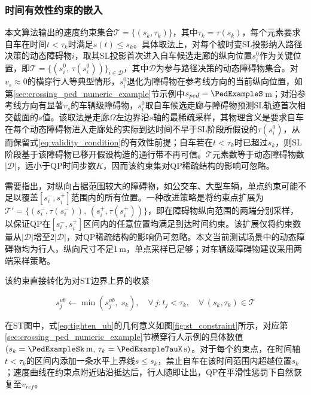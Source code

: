 \subsubsection{时间有效性约束的嵌入}
本文算法输出的速度约束集合$\mathcal{T} = \{(s_k, \tau_k)\}$，其中$\tau_k = \tau(s_k)$，每个元素要求自车在时间$t<\tau_k$时满足$s(t)\leq s_k$。具体取法上，对每个被时变SL投影纳入路径决策的动态障碍物$i$，取其SL投影首次进入自车候选走廊的纵向位置$s_i^{0}$作为关键位置，即$\mathcal{T} = \{(s_i^{0},\,\tau(s_i^{0}))\}_{i\in\mathcal{D}}$，其中$\mathcal{D}$为参与路径决策的动态障碍物集合。对$v_s\approx 0$的横穿行人等典型情形，$s_i^{0}$退化为障碍物在参考线方向的当前纵向位置，如第\ref{sec:crossing_ped_numeric_example}节示例中$s_{ped}=\PedExampleS$\,m；对沿参考线方向有显著$v_s$的车辆级障碍物，$s_i^{0}$取自车候选走廊与障碍物预测SL轨迹首次相交截面的$s$值。该取法是走廊$\Omega$左边界沿$s$轴的最稀疏采样，其物理含义是要求自车在每个动态障碍物进入走廊处的实际到达时间不早于SL阶段所假设的$\tau(s_i^{0})$，从而保留式\eqref{eq:validity_condition}的有效性前提；自车若在$t<\tau_k$时已超过$s_k$，则SL阶段基于该障碍物已移开假设构造的通行带不再可信。$\mathcal{T}$元素数等于动态障碍物数$|\mathcal{D}|$，远小于QP时间步数$K$，因而该约束集对QP稀疏结构的影响可忽略。

需要指出，对纵向占据范围较大的障碍物，如公交车、大型车辆，单点约束可能不足以覆盖$[s_i^{-}, s_i^{+}]$范围内的所有位置。一种改进策略是将约束点扩展为$\mathcal{T}' = \{(s_i^{-}, \tau(s_i^{-})),\, (s_i^{+}, \tau(s_i^{+}))\}$，即在障碍物纵向范围的两端分别采样，以保证QP在$[s_i^{-}, s_i^{+}]$区间内的任意位置均满足到达时间约束。该扩展仅将约束数量从$|\mathcal{D}|$增至$2|\mathcal{D}|$，对QP稀疏结构的影响仍可忽略。本文当前测试场景中的动态障碍物均为行人，纵向尺寸不足1\,m，单点采样已足够；对车辆级障碍物建议采用两端采样策略。

该约束直接转化为对ST边界上界的收紧

\begin{equation}
    s_j^{ub} \leftarrow \min\!\left(s_j^{ub},\; s_k\right), \quad \forall\, j: t_j < \tau_k, \quad \forall\, (s_k, \tau_k) \in \mathcal{T}
    \label{eq:tighten_ub}
\end{equation}

在ST图中，式\eqref{eq:tighten_ub}的几何意义如图\ref{fig:st_constraint}所示，对应第\ref{sec:crossing_ped_numeric_example}节横穿行人示例的具体数值$(s_k=\PedExampleSk\,\text{m},\,\tau_k=\PedExampleTauK\,\text{s})$。对于每个约束点，在时间轴$t < \tau_k$的区间内添加一条水平上界线$s \leq s_k$，禁止自车在该时间范围内超越位置$s_k$；速度曲线在约束点附近贴沿抵达后，行人随即让出，QP在平滑性惩罚下自然恢复至$v_{ref}$。

